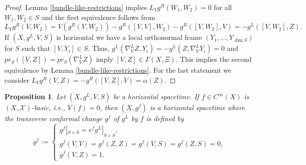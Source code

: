 \documentclass[a4paper,10pt,twoside]{amsart}
\newtheorem{proposition}[theorem]{Proposition}
\theoremstyle{definition}
\theoremstyle{remark}
\numberwithin{equation}{section}
\begin{document}
\begin{proof}
	Lemma \ref{bundle-like-restrictions} implies $L_{V}g^{R}(W_{1},W_{2})=0$ for all $W_{1},W_{2} \in S$ and the first equivalence follows from
	\begin{equation*}
		L_{V}g^{R}(V,W_{2}) =V(g^{R}(V,W_{2})) -g^{R}([V,V],W_{2}) -g^{R}([V,W_{2}],V) = -g^{L}([V,W_{2}],Z).
	\end{equation*}
	If $(X,g^{L},V,S)$ is horizontal we have a local orthonormal frame $(Y_{1},\ldots,Y_{\dim S})$ for $S$
	such that $[V,Y_{i}] \in S$. Thus, $g^{L}(\nabla^{L}_{V}{Z},Y_{i})=-g^{L}(Z,\nabla^{L}_{V}{Y_{i}})=0$ and
	$pr_{S}([V,Z])= pr_{S}(\nabla^{L}_{V}{Z})$ imply $[V,Z] \in \Gamma(X,\Xi)$. This implies the second equivalence by
	Lemma \ref{bundle-like-restrictions}. For the last statement we consider $L_{V}g^{R}(V,Z)=-g^{R}([V,Z],V)=\alpha(Z)$.\end{proof}
\begin{proposition}
	Let $(X,g^{L},V,S)$ be a horizontal spacetime. If $f \in C^{\infty}(X)$ is $(X,\mathcal{X})$-basic, i.e., $V(f)=0$, then $(X,g^{f})$ is a
	horizontal spacetime where the transverse conformal change $g^{f}$ of $g^{L}$ by $f$ is defined by
	\begin{equation*}
		g^{f} := \begin{cases}
				g^{f}|_{S \times S} = e^{f}g^{L}|_{S \times S},\\
				g^{f}(V,V) = g^{f}(Z,Z) = g^{f}(V,S) = g^{f}(Z,S) =0,\\
				g^{f}(V,Z) =1.
		         \end{cases}
	\end{equation*}
\end{proposition}
\end{document}
